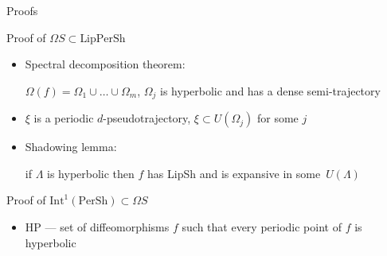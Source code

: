 \documentclass{beamer}
\begin{document}
\begin{section}{Proofs}
\begin{frame}{Proof of $\Omega S\subset\mbox{LipPerSh}$}
\begin{itemize}
%	
	\item Spectral decomposition theorem: 
	
	$\Omega(f)=\Omega_1\cup\ldots\cup\Omega_m$, $\Omega_j$ is hyperbolic and has a dense semi-trajectory
  \item $\xi$ is a periodic $d$-pseudotrajectory, $\xi\subset U(\Omega_j)$ for some $j$ 
	\item Shadowing lemma: 
	
	if $\Lambda$ is hyperbolic then $f$ has LipSh and is expansive in some~$U(\Lambda)$ 
\end{itemize}
\end{frame}
\begin{frame}{Proof of $\mbox{Int}^1(\mbox{PerSh})\subset\Omega S$}
\begin{itemize}
	\item HP --- set of diffeomorphisms $f$ such that every periodic point of $f$ is hyperbolic
	

\end{itemize}
\end{frame}
\end{section}
\end{document}
